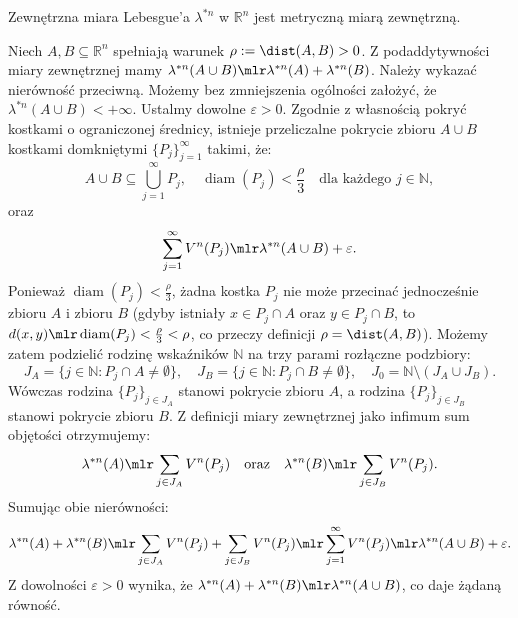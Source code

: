 \begin{tw}

    Zewnętrzna miara Lebesgue'a $\lambda^{*n}$ w $\mathbb{R}^n$ jest metryczną miarą zewnętrzną.

\end{tw}
\begin{dow} Niech $A, B \subseteq \mathbb{R}^n$ spełniają warunek $\rho := \dist(A, B) > 0$. Z podaddytywności miary zewnętrznej mamy $\lambda^{*n}(A \cup B) \mlr \lambda^{*n}(A) + \lambda^{*n}(B)$. Należy wykazać nierówność przeciwną. Możemy bez zmniejszenia ogólności założyć, że $\lambda^{*n}(A \cup B) < +\infty$. Ustalmy dowolne $\varepsilon > 0$. Zgodnie z własnością pokryć kostkami o ograniczonej średnicy, istnieje przeliczalne pokrycie zbioru $A \cup B$ kostkami domkniętymi $\{P_j\}_{j=1}^\infty$ takimi, że:
    \begin{equation*}
        A \cup B \subseteq \bigcup_{j=1}^\infty P_j, \quad \operatorname{diam}(P_j) < \frac{\rho}{3} \quad \text{dla każdego } j \in \mathbb{N},
    \end{equation*}
    oraz
    \begin{equation*}
        \sum_{j=1}^\infty V^n(P_j) \mlr \lambda^{*n}(A \cup B) + \varepsilon.
    \end{equation*}
    Ponieważ $\operatorname{diam}(P_j) < \frac{\rho}{3}$, żadna kostka $P_j$ nie może przecinać jednocześnie zbioru $A$ i zbioru $B$ (gdyby istniały $x \in P_j \cap A$ oraz $y \in P_j \cap B$, to $d(x, y) \mlr \operatorname{diam}(P_j) < \frac{\rho}{3} < \rho$, co przeczy definicji $\rho = \dist(A, B)$). Możemy zatem podzielić rodzinę wskaźników $\mathbb{N}$ na trzy parami rozłączne podzbiory:
    \begin{equation*}
        J_A = \{j \in \mathbb{N} \colon P_j \cap A \neq \emptyset\}, \quad J_B = \{j \in \mathbb{N} \colon P_j \cap B \neq \emptyset\}, \quad J_0 = \mathbb{N} \setminus (J_A \cup J_B).
    \end{equation*}
    Wówczas rodzina $\{P_j\}_{j \in J_A}$ stanowi pokrycie zbioru $A$, a rodzina $\{P_j\}_{j \in J_B}$ stanowi pokrycie zbioru $B$. Z definicji miary zewnętrznej jako infimum sum objętości otrzymujemy:
    \begin{equation*}
        \lambda^{*n}(A) \mlr \sum_{j \in J_A} V^n(P_j) \quad \text{oraz} \quad \lambda^{*n}(B) \mlr \sum_{j \in J_B} V^n(P_j).
    \end{equation*}
    Sumując obie nierówności:
    \begin{equation*}
        \lambda^{*n}(A) + \lambda^{*n}(B) \mlr \sum_{j \in J_A} V^n(P_j) + \sum_{j \in J_B} V^n(P_j) \mlr \sum_{j=1}^\infty V^n(P_j) \mlr \lambda^{*n}(A \cup B) + \varepsilon.
    \end{equation*}
    Z dowolności $\varepsilon > 0$ wynika, że $\lambda^{*n}(A) + \lambda^{*n}(B) \mlr \lambda^{*n}(A \cup B)$, co daje żądaną równość.
\end{dow}
